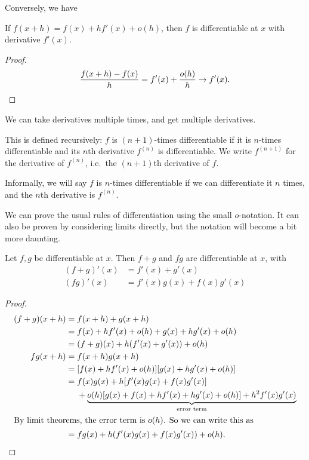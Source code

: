 \documentclass[a4paper]{article}
\begin{document}
Conversely, we have
\begin{prop}
  If $f(x + h) = f(x) + hf'(x) + o(h)$, then $f$ is differentiable at $x$ with derivative $f'(x)$.
\end{prop}
\begin{proof}
  \[
    \frac{f(x + h) - f(x)}{h} = f'(x) + \frac{o(h)}{h} \to f'(x).\qedhere
  \]
\end{proof}

We can take derivatives multiple times, and get multiple derivatives.
\begin{defi}
  This is defined recursively: $f$ is $(n + 1)$-times differentiable if it is $n$-times differentiable and its $n$th derivative $f^{(n)}$ is differentiable. We write $f^{(n + 1)}$ for the derivative of $f^{(n)}$, i.e.\ the $(n + 1)$th derivative of $f$.

  Informally, we will say $f$ is $n$-times differentiable if we can differentiate it $n$ times, and the $n$th derivative is $f^{(n)}$.
\end{defi}

We can prove the usual rules of differentiation using the small $o$-notation. It can also be proven by considering limits directly, but the notation will become a bit more daunting.
\begin{lemma}
  Let $f, g$ be differentiable at $x$. Then $f + g$ and $fg$ are differentiable at $x$, with
  \begin{align*}
    (f + g)'(x) &= f'(x) + g'(x)\\
    (fg)'(x) &= f'(x)g(x) + f(x)g'(x)
  \end{align*}
\end{lemma}

\begin{proof}
  \begin{align*}
    (f + g)(x + h) ={}& f(x + h) + g(x + h)\\
    ={}& f(x) +hf'(x) + o(h) + g(x) + hg'(x) + o(h)\\
    ={}& (f + g)(x) + h(f'(x) + g'(x)) + o(h)\\
    fg(x + h) ={}& f(x + h)g(x + h)\\
    ={}& [f(x) + hf'(x) + o(h)][g(x) + hg'(x) + o(h)]\\
    ={}& f(x)g(x) + h[f'(x)g(x) + f(x)g'(x)]\\
    &+ \underbrace{o(h)[g(x) + f(x) + hf'(x) + hg'(x) + o(h)] + h^2f'(x)g'(x)}_{\text{error term}}\\
    \intertext{By limit theorems, the error term is $o(h)$. So we can write this as}
    ={}& fg(x) + h(f'(x)g(x) + f(x)g'(x)) + o(h).\qedhere
  \end{align*}
\end{proof}
\end{document}

